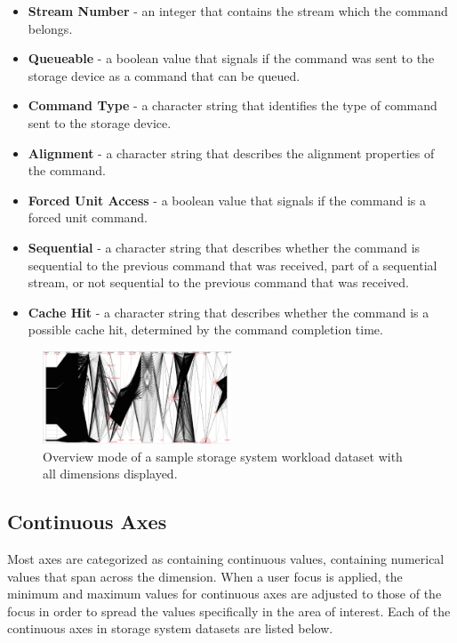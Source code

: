 \documentclass[journal]{vgtc}                %
\begin{document}
\begin{itemize}
\item \textbf{Stream Number} - an integer that contains the stream which the command belongs.

\item \textbf{Queueable} - a boolean value that signals if the command was sent to the storage device as a command that can be queued. 

\item \textbf{Command Type} - a character string that identifies the type of command sent to the storage device.

\item \textbf{Alignment} - a character string that describes the alignment properties of the command.

\item \textbf{Forced Unit Access} - a boolean value that signals if the command is a forced unit command.

\item \textbf{Sequential} - a character string that describes whether the command is sequential to the previous command that was received, part of a sequential stream, or not sequential to the previous command that was received.

\item \textbf{Cache Hit} - a character string that describes whether the command is a possible cache hit, determined by the command completion time.
\end{itemize}

\begin{figure}[h!]
 \centering
 \includegraphics[width=0.5\textwidth]{images/overview.eps}
 \caption[Overview mode of a sample storage system workload dataset.]{Overview mode of a sample storage system workload dataset with all dimensions displayed.}
 \label{fig:overview}
\end{figure}

\subsection{Continuous Axes}
Most axes are categorized as containing continuous values, containing numerical values that span across the dimension. When a user focus is applied, the minimum and maximum values for continuous axes are adjusted to those of the focus in order to spread the values specifically in the area of interest. Each of the continuous axes in storage system datasets are listed below.
\end{document}
